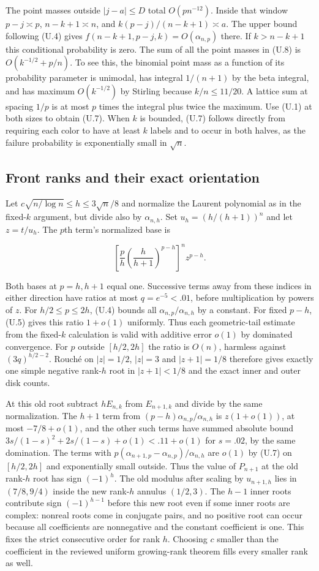 \documentclass[11pt]{article}
\begin{document}
The point masses outside $|j-a|\le D$ total $O(p n^{-12})$. Inside that window $p-j\asymp p$, $n-k+1\asymp n$, and $k(p-j)/(n-k+1)\asymp a$. The upper bound following (U.4) gives $f(n-k+1,p-j,k)=O(\alpha_{n,p})$ there. If $k>n-k+1$ this conditional probability is zero. The sum of all the point masses in (U.8) is $O(k^{-1/2}+p/n)$. To see this, the binomial point mass as a function of its probability parameter is unimodal, has integral $1/(n+1)$ by the beta integral, and has maximum $O(k^{-1/2})$ by Stirling because $k/n\le11/20$. A lattice sum at spacing $1/p$ is at most $p$ times the integral plus twice the maximum. Use (U.1) at both sizes to obtain (U.7). When $k$ is bounded, (U.7) follows directly from requiring each color to have at least $k$ labels and to occur in both halves, as the failure probability is exponentially small in $\sqrt n$.

\subsection{Front ranks and their exact orientation}

Let $c\sqrt{n/\log n}\le h\le3\sqrt n/8$ and normalize the Laurent polynomial as in the fixed-$k$ argument, but divide also by $\alpha_{n,h}$. Set $u_h=(h/(h+1))^n$ and let $z=t/u_h$. The $p$th term's normalized base is

\[
\left[\frac ph\left(\frac h{h+1}\right)^{p-h}\right]^n z^{p-h}.
\]

Both bases at $p=h,h+1$ equal one. Successive terms away from these indices in either direction have ratios at most $q=e^{-5}<.01$, before multiplication by powers of $z$. For $h/2\le p\le2h$, (U.4) bounds all $\alpha_{n,p}/\alpha_{n,h}$ by a constant. For fixed $p-h$, (U.5) gives this ratio $1+o(1)$ uniformly. Thus each geometric-tail estimate from the fixed-$k$ calculation is valid with additive error $o(1)$ by dominated convergence. For $p$ outside $[h/2,2h]$ the ratio is $O(n)$, harmless against $(3q)^{h/2-2}$. Rouché on $|z|=1/2$, $|z|=3$ and $|z+1|=1/8$ therefore gives exactly one simple negative rank-$h$ root in $|z+1|<1/8$ and the exact inner and outer disk counts.

At this old root subtract $h E_{n,k}$ from $E_{n+1,k}$ and divide by the same normalization. The $h+1$ term from $(p-h)\alpha_{n,p}/\alpha_{n,h}$ is $z(1+o(1))$, at most $-7/8+o(1)$, and the other such terms have summed absolute bound $3s/(1-s)^2+2s/(1-s)+o(1)<.11+o(1)$ for $s=.02$, by the same domination. The terms with $p(\alpha_{n+1,p}-\alpha_{n,p})/\alpha_{n,h}$ are $o(1)$ by (U.7) on $[h/2,2h]$ and exponentially small outside. Thus the value of $P_{n+1}$ at the old rank-$h$ root has sign $(-1)^h$. The old modulus after scaling by $u_{n+1,h}$ lies in $(7/8,9/4)$ inside the new rank-$h$ annulus $(1/2,3)$. The $h-1$ inner roots contribute sign $(-1)^{h-1}$ before this new root even if some inner roots are complex: nonreal roots come in conjugate pairs, and no positive root can occur because all coefficients are nonnegative and the constant coefficient is one. This fixes the strict consecutive order for rank $h$. Choosing $c$ smaller than the coefficient in the reviewed uniform growing-rank theorem fills every smaller rank as well.
\end{document}
